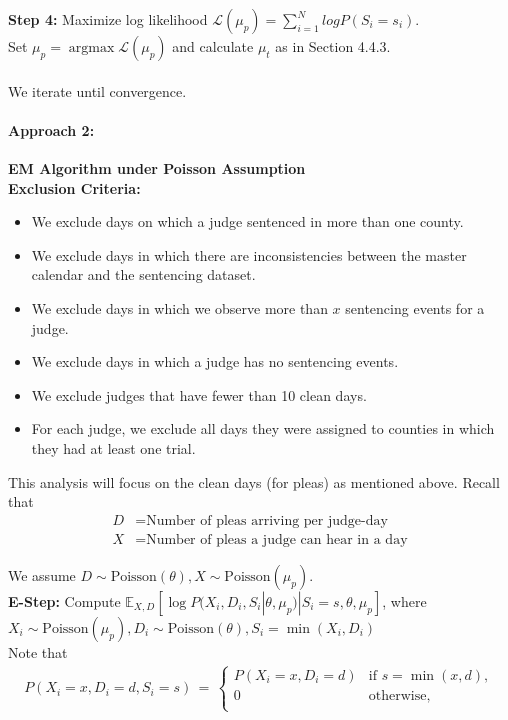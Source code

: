 \documentclass[11pt, oneside]{article}   	%
\theoremstyle{ModifiedStyle}
\DeclareMathOperator*{\argmax}{argmax}
\begin{document}
			\noindent \textbf{Step 4:} Maximize log likelihood $\mathscr{L}(\mu_p) = \sum_{i=1}^N log P(S_i = s_i)$. \\
			Set $\mu_p = \argmax \mathscr{L}(\mu_p)$ and calculate $\mu_t$ as in Section 4.4.3. \\
			\\
			We iterate until convergence.

			\paragraph{Approach 2:} \textbf{EM Algorithm under Poisson Assumption}\\
			\textbf{Exclusion Criteria:}
			\begin{itemize}
				\item We exclude days on which a judge sentenced in more than one county.
				\item We exclude days in which there are inconsistencies between the master calendar
				and the sentencing dataset.
				\item We exclude days in which we observe more than $x$ sentencing events for a judge.
				\item We exclude days in which a judge has no sentencing events.
				\item We exclude judges that have fewer than 10 clean days.
				\item For each judge, we exclude all days they were assigned to counties in which they had at least one trial.
			\end{itemize}
			 This analysis will focus on the clean days (for pleas) as mentioned above. Recall that \begin{align*}
				D &= \text{Number of pleas arriving per judge-day}\\
				X &= \text{Number of pleas a judge can hear in a day}
			\end{align*}

			We assume $D \sim \text{Poisson}(\theta), X \sim \text{Poisson}(\mu_p)$.\\
			\textbf{E-Step:} Compute $\mathbb{E}_{X,D}[\log P(X_i,D_i,S_i|\theta,\mu_p)|S_i=s,\theta,\mu_p]$,
			where $X_i \sim \text{Poisson}(\mu_p), D_i \sim \text{Poisson}(\theta), S_i = \min(X_i,D_i)$\\
			Note that
			\begin{align*}
			P(X_i=x,D_i=d,S_i=s) \,=\, \left \{\!\! \begin{array}{ll}
			P(X_i = x,D_i=d) & \text{if } s= \min(x,d), \\
			0 & \text{otherwise}, \\
			\end{array} \right.
			\end{align*}
\end{document}
